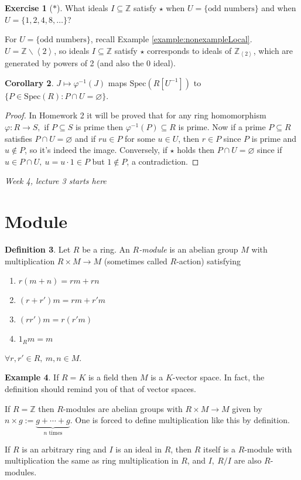 \documentclass[a4paper]{article}
\newcommand{\la}{\left\langle}
\newcommand{\ra}{\right\rangle}
\newcommand{\Z}{\mathbb Z}
\newcommand{\Spec}{\text{Spec}}
\theoremstyle{definition}
\newtheorem{defn}{Definition}[subsection]
\newtheorem{coro}[defn]{Corollary}
\newtheorem{example}[defn]{Example}
\newtheorem{exe}[defn]{Exercise}
\begin{document}
\begin{exe}[$\ast$]
What ideals $I\subseteq \Z$ satisfy $\star$ when $U=\{\text{odd numbers}\}$ and when $U=\{1,2,4,8,\ldots\}$?

For $U=\{\text{odd numbers}\}$, recall Example \ref{example:nonexampleLocal}. $U=\Z\backslash \la2\ra$, so ideals $I\subseteq \Z$ satisfy $\star$ corresponds to ideals of $\Z_{\la 2\ra}$, which are generated by powers of 2 (and also the 0 ideal).
\end{exe}

\begin{coro}
$J\mapsto \varphi^{-1}(J)$ maps $\Spec(R[U^{-1}])$ to $\{P\in\Spec(R):P\cap U=\varnothing\}$.
\end{coro}

\begin{proof}
In Homework 2 it will be proved that for any ring homomorphism $\varphi:R\rightarrow S,$ if $P\subseteq S$ is prime then $\varphi^{-1}(P)\subseteq R$ is prime. Now if a prime $P\subseteq R$ satisfies $P\cap U=\varnothing$ and if $ru\in P$ for some $u\in U$, then $r\in P$ since $P$ is prime and $u\notin P$, so it's indeed the image. Conversely, if $\star$ holds then $P\cap U=\varnothing$ since if $u\in P\cap U,\ u=u\cdot 1\in P$ but $1\notin P$, a contradiction.
\end{proof}

\begin{flushright}
\textit{Week 4, lecture 3 starts here}
\end{flushright}

\section{Module}
\begin{defn}
Let $R$ be a ring. An $R$\textit{-module} is an abelian group $M$ with multiplication $R\times M\rightarrow M$ (sometimes called $R$-action) satisfying
\begin{enumerate}
\item $r(m+n)=rm+rn$ 
\item $(r+r')m=rm+r'm$
\item $(rr')m=r(r'm)$
\item $1_R m=m$
\end{enumerate}
$\forall r,r'\in R,\ m,n\in M$.
\end{defn}

\begin{example}
If $R=K$ is a field then $M$ is a $K$-vector space. In fact, the definition should remind you of that of vector spaces.

If $R=\Z$ then $R$-modules are abelian groups with $R\times M\rightarrow M$ given by $n\times g:=\underbrace{g+\cdots+g}_{n\text{ times}}$. One is forced to define multiplication like this by definition.

If $R$ is an arbitrary ring and $I$ is an ideal in $R$, then $R$ itself is a $R$-module with multiplication the same as ring multiplication in $R$, and $I,\ R/I$ are also $R$-modules.
\end{example}
\end{document}
